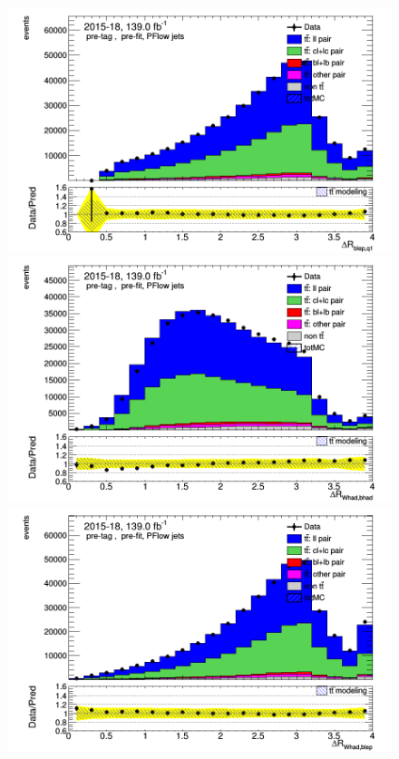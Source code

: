 \documentclass[letterpaper,12pt]{article}
\begin{document}
\begin{figure}
\begin{minipage}[b]{.45\textwidth}
	\end{minipage}\hfill
	\begin{minipage}[b]{.45\textwidth}
	\centering
	\includegraphics[width=1\textwidth]{Oct_distributions/pretagNoRwDL1rwithhighpTPFlow_scaledall/DataMC_dRblepq1.png} 
	\end{minipage}\hfill
	\begin{minipage}[b]{.45\textwidth}
	\centering
	\includegraphics[width=1\textwidth]{Oct_distributions/pretagNoRwDL1rwithhighpTPFlow_scaledall/DataMC_dRWhadbhad.png} 
	\end{minipage}\hfill
	\begin{minipage}[b]{.45\textwidth}
	\centering
	\includegraphics[width=1\textwidth]{Oct_distributions/pretagNoRwDL1rwithhighpTPFlow_scaledall/DataMC_dRWhadblep.png} 

\end{minipage}
\end{figure}
\end{document}
